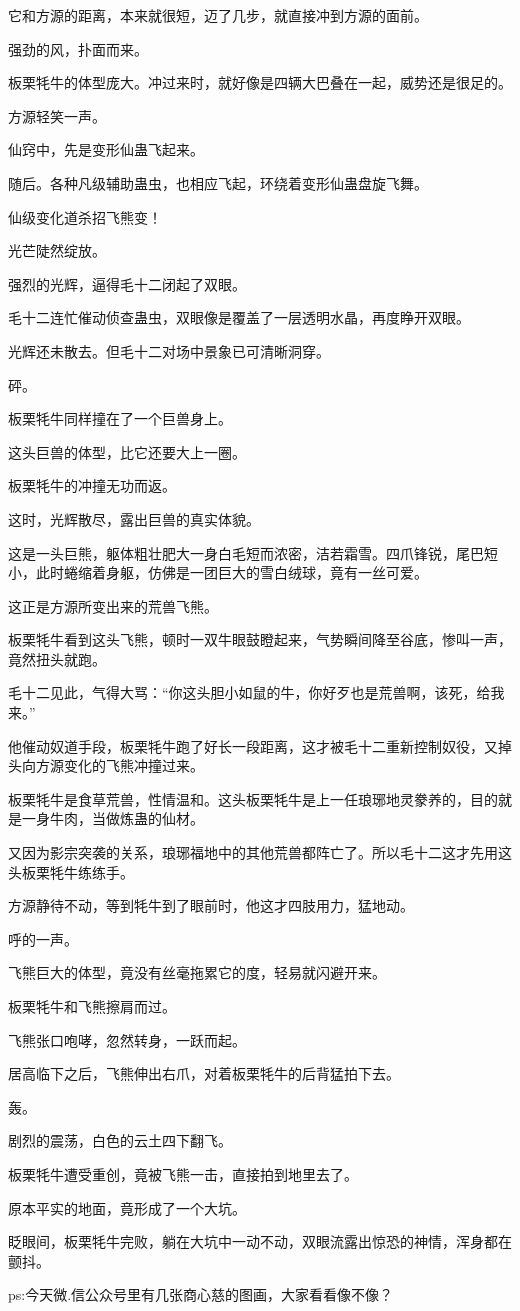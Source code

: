 \begin{this_body}
它和方源的距离，本来就很短，迈了几步，就直接冲到方源的面前。

强劲的风，扑面而来。

板栗牦牛的体型庞大。冲过来时，就好像是四辆大巴叠在一起，威势还是很足的。

方源轻笑一声。

仙窍中，先是变形仙蛊飞起来。

随后。各种凡级辅助蛊虫，也相应飞起，环绕着变形仙蛊盘旋飞舞。

仙级变化道杀招飞熊变！

光芒陡然绽放。

强烈的光辉，逼得毛十二闭起了双眼。

毛十二连忙催动侦查蛊虫，双眼像是覆盖了一层透明水晶，再度睁开双眼。

光辉还未散去。但毛十二对场中景象已可清晰洞穿。

砰。

板栗牦牛同样撞在了一个巨兽身上。

这头巨兽的体型，比它还要大上一圈。

板栗牦牛的冲撞无功而返。

这时，光辉散尽，露出巨兽的真实体貌。

这是一头巨熊，躯体粗壮肥大一身白毛短而浓密，洁若霜雪。四爪锋锐，尾巴短小，此时蜷缩着身躯，仿佛是一团巨大的雪白绒球，竟有一丝可爱。

这正是方源所变出来的荒兽飞熊。

板栗牦牛看到这头飞熊，顿时一双牛眼鼓瞪起来，气势瞬间降至谷底，惨叫一声，竟然扭头就跑。

毛十二见此，气得大骂：“你这头胆小如鼠的牛，你好歹也是荒兽啊，该死，给我来。”

他催动奴道手段，板栗牦牛跑了好长一段距离，这才被毛十二重新控制奴役，又掉头向方源变化的飞熊冲撞过来。

板栗牦牛是食草荒兽，性情温和。这头板栗牦牛是上一任琅琊地灵豢养的，目的就是一身牛肉，当做炼蛊的仙材。

又因为影宗突袭的关系，琅琊福地中的其他荒兽都阵亡了。所以毛十二这才先用这头板栗牦牛练练手。

方源静待不动，等到牦牛到了眼前时，他这才四肢用力，猛地动。

呼的一声。

飞熊巨大的体型，竟没有丝毫拖累它的度，轻易就闪避开来。

板栗牦牛和飞熊擦肩而过。

飞熊张口咆哮，忽然转身，一跃而起。

居高临下之后，飞熊伸出右爪，对着板栗牦牛的后背猛拍下去。

轰。

剧烈的震荡，白色的云土四下翻飞。

板栗牦牛遭受重创，竟被飞熊一击，直接拍到地里去了。

原本平实的地面，竟形成了一个大坑。

眨眼间，板栗牦牛完败，躺在大坑中一动不动，双眼流露出惊恐的神情，浑身都在颤抖。

ps:今天微.信公众号里有几张商心慈的图画，大家看看像不像？

\end{this_body}

